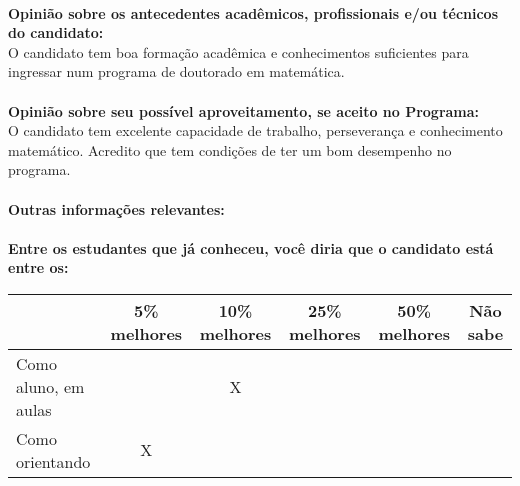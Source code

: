 \documentclass[11pt]{article}
\begin{document}
\\
\textbf{Opinião sobre os antecedentes acadêmicos, profissionais e/ou técnicos do candidato:}
\\O candidato tem boa formação acadêmica e conhecimentos suficientes para ingressar num programa de doutorado em matemática.\\
\\
\textbf{Opinião sobre seu possível aproveitamento, se aceito no Programa:}
\\O candidato tem excelente capacidade de trabalho, perseverança e conhecimento matemático. Acredito que tem condições de ter um bom desempenho no programa.\\ 
\\
\textbf{Outras informações relevantes:} \\
\\[0.3cm]
\textbf{Entre os estudantes que já conheceu, você diria que o candidato está entre os:}
\\
\begin{tabular}{|l|c|c|c|c|c|}
\hline
 & 5\% melhores & 10\% melhores & 25\% melhores & 50\% melhores & Não sabe \\
\hline
Como aluno, em aulas &  & X &  &  & \\
\hline
Como orientando & X &  &  &  & \\
\hline
\end{tabular}
\end{document}
